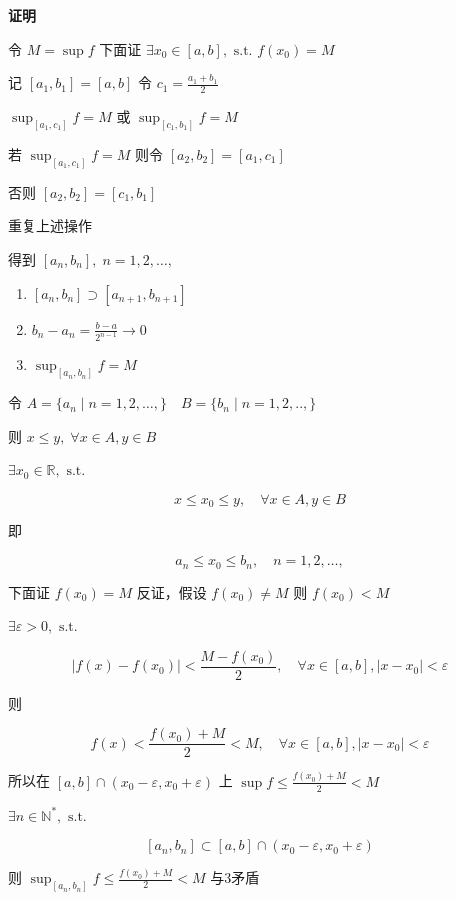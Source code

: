 \textbf{证明}

令 \(M=\sup f\) 下面证
\(\exists x_{0}\in[a,b],\text{ s.t. } f(x_{0})=M\)

记 \([a_{1},b_{1}]=[a,b]\) 令 \(c_{1}=\frac{a_{1}+b_{1}}{2}\)

\(\sup_{[a_{1},c_{1}]} f=M\) 或 \(\sup_{[c_{1},b_{1}]}f=M\)

若 \(\sup_{[a_{1},c_{1}]}f=M\) 则令 \([a_{2},b_{2}]=[a_{1},c_{1}]\)

否则 \([a_{2},b_{2}]=[c_{1},b_{1}]\)

重复上述操作

得到 \([a_{n},b_{n}],\;n=1,2,\dots,\)

\begin{enumerate}
\def\labelenumi{\arabic{enumi}.}
\tightlist
\item
  \([a_{n},b_{n}]\supset[a_{n+1},b_{n+1}]\)
\item
  \(b_{n}-a_{n}=\frac{b-a}{2^{n-1}}\to 0\)
\item
  \(\sup_{[a_{n},b_{n}]}f=M\)
\end{enumerate}

令 \(A=\{ a_{n} \mid n=1,2,\dots, \} \quad B=\{ b_{n}\mid n=1,2,.., \}\)

则 \(x\leq y, \; \forall x \in A, y\in B\)

\(\exists x_{0}\in \mathbb{R},\text{ s.t.}\)

\[
x\leq x_{0}\leq y, \quad \forall x \in A, y \in B
\]

即

\[
a_{n}\leq x_{0}\leq b_{n}, \quad n=1,2,\dots,
\]

下面证 \(f(x_{0})=M\) 反证，假设 \(f(x_{0})\neq M\) 则 \(f(x_{0})<M\)

\(\exists \varepsilon>0,\text{ s.t.}\)

\[
|f(x)-f(x_{0})|< \frac{M-f(x_{0})}{2}, \quad \forall x \in [a,b],|x-x_{0}|<\varepsilon
\]

则

\[
f(x)< \frac{f(x_{0})+M}{2}<M, \quad \forall x \in [a,b], |x-x_{0}|<\varepsilon
\]

所以在 \([a,b]\cap(x_{0}-\varepsilon,x_{0}+\varepsilon)\) 上
\(\sup f \leq \frac{f(x_{0})+M}{2}<M\)

\(\exists n \in \mathbb{N}^{*},\text{ s.t.}\)

\[
[a_{n},b_{n}]\subset[a,b]\cap(x_{0}-\varepsilon,x_{0}+\varepsilon)
\]

则 \(\sup_{[a_{n},b_{n}]}f\leq \frac{f(x_{0})+M}{2}<M\) 与3矛盾

